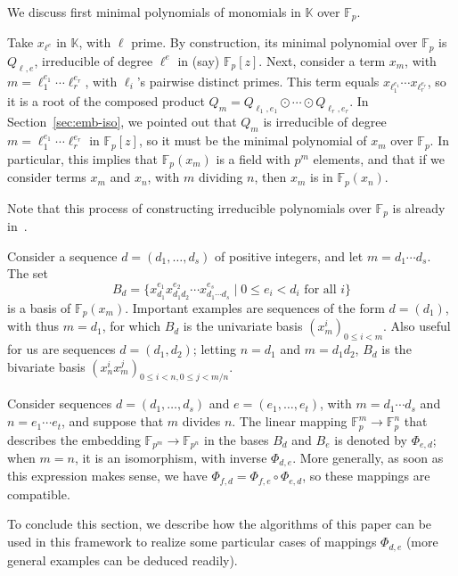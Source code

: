 \documentclass{sig-alternate}
\def\F {\ensuremath{\mathbb{F}}}
\def\K {\ensuremath{\mathbb{K}}}
\newcounter{algo}
\begin{document}
\smallskip{}  We discuss first
minimal polynomials of monomials in $\K$ over $\F_p$.

Take $x_{\ell^{e}}$ in $\K$, with $\ell$ prime. By construction, its
minimal polynomial over $\F_p$ is $Q_{\ell,e}$, irreducible of degree
$\ell^{e}$ in (say) $\F_p[z]$. Next, consider a term $x_m$, with
$m=\ell_1^{e_1}\cdots \ell_r^{e_r}$, with $\ell_i$'s pairwise distinct
primes. This term equals $x_{\ell_1^{e_1}} \cdots x_{\ell_r^{e_r}}$,
so it is a root of the composed product $Q_{m}=Q_{\ell_1,e_1} \odot \cdots
\odot Q_{\ell_r,e_r}.$ In Section~\ref{sec:emb-iso}, we pointed out
that $Q_m$ is irreducible of degree $m=\ell_1^{e_1}\cdots
\ell_r^{e_r}$ in $\F_p[z]$, so it must be the minimal polynomial of
$x_m$ over $\F_p$.  In particular, this implies that $\F_p(x_m)$ is a
field with $p^m$ elements, and that if we consider terms $x_m$ and
$x_n$, with $m$ dividing $n$, then $x_m$ is in $\F_p(x_n)$.

Note that this process of constructing irreducible polynomials over
$\F_p$ is already in~\cite{Shoup90,shoup94,couveignes+lercier11}.

\smallskip{}
Consider a sequence $d=(d_1,\dots,d_s)$ of positive integers, and let
$m=d_1 \cdots d_s$. The set
$$B_d = \{ x_{d_1}^{e_1} x_{d_1 d_2}^{e_2} \cdots x_{d_1 \cdots
  d_s}^{e_s} \mid 0 \le e_i < d_i \text{~for all $i$}\}$$ is a basis
of $\F_p(x_m)$. Important examples are sequences of the form $d=(d_1)$,
with thus $m=d_1$, for which $B_d$ is the univariate basis $(x_m^i)_{0
  \le i < m}$. Also useful for us are sequences $d=(d_1,d_2)$; letting
$n=d_1$ and $m=d_1 d_2$, $B_d$ is the bivariate basis $(x_n^i
x_m^j)_{0 \le i < n, 0 \le j < m/n}$.

Consider sequences $d=(d_1,\dots,d_s)$ and $e=(e_1,\dots,e_t)$, with
$m=d_1 \cdots d_s$ and $n=e_1 \cdots e_t$, and suppose that $m$
divides $n$. The linear mapping $\F_p^m \to \F_p^n$ that describes the
embedding $\F_{p^m} \to \F_{p^n}$ in the bases $B_d$ and $B_e$ is
denoted by $\Phi_{e,d}$; when $m=n$, it is an isomorphism, with
inverse $\Phi_{d,e}$. More generally, as soon as this expression makes
sense, we have $\Phi_{f,d} = \Phi_{f,e}\circ \Phi_{e,d}$, so these
mappings are compatible.

To conclude this section, we describe how the algorithms of this paper
can be used in this framework to realize some particular cases of
mappings $\Phi_{d,e}$ (more general examples can be deduced readily).
\end{document}
